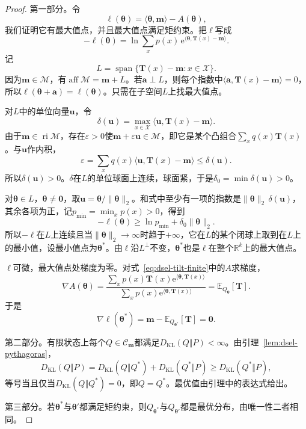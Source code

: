 \begin{proof}
第一部分。令
\[
 \ell(\bm{\theta})=\langle\bm{\theta},\bm{m}\rangle-A(\bm{\theta}) ,
\]
我们证明它有最大值点，并且最大值点满足矩约束。把$\ell$写成
\[
 -\ell(\bm{\theta})=\ln\sum_xp(x)\,\mathrm{e}^{\langle\bm{\theta},\bm{T}(x)-\bm{m}\rangle} .
\]
记
\[
 L=\operatorname{span}\{\bm{T}(x)-\bm{m}:x\in\mathcal{X}\} .
\]
因为$\bm{m}\in\mathcal{M}$，有$\operatorname{aff}\mathcal{M}=\bm{m}+L$。若$\bm{a}\perp L$，则每个指数中$\langle\bm{a},\bm{T}(x)-\bm{m}\rangle=0$，所以$\ell(\bm{\theta}+\bm{a})=\ell(\bm{\theta})$。只需在子空间$L$上找最大值点。

对$L$中的单位向量$\bm{u}$，令
\[
 \delta(\bm{u})=\max_{x\in\mathcal{X}}\langle\bm{u},\bm{T}(x)-\bm{m}\rangle .
\]
由于$\bm{m}\in\operatorname{ri}\mathcal{M}$，存在$\varepsilon>0$使$\bm{m}+\varepsilon\bm{u}\in\mathcal{M}$，即它是某个凸组合$\sum_xq(x)\bm{T}(x)$。与$\bm{u}$作内积，
\[
 \varepsilon=\sum_xq(x)\langle\bm{u},\bm{T}(x)-\bm{m}\rangle\leq\delta(\bm{u}) .
\]
所以$\delta(\bm{u})>0$。$\delta$在$L$的单位球面上连续，球面紧，于是$\delta_0=\min\delta(\bm{u})>0$。

对$\bm{\theta}\in L$，$\bm{\theta}\neq\bm{0}$，取$\bm{u}=\bm{\theta}/\lVert\bm{\theta}\rVert_2$。和式中至少有一项的指数是$\lVert\bm{\theta}\rVert_2\,\delta(\bm{u})$，其余各项为正，记$p_{\min}=\min_xp(x)>0$，得到
\[
 -\ell(\bm{\theta})\geq\ln p_{\min}+\delta_0\lVert\bm{\theta}\rVert_2 .
\]
所以$-\ell$在$L$上连续且当$\lVert\bm{\theta}\rVert_2\to\infty$时趋于$+\infty$，它在$L$的某个闭球上取到在$L$上的最小值，设最小值点为$\bm{\theta}^{*}$。由$\ell$沿$L^{\perp}$不变，$\bm{\theta}^{*}$也是$\ell$在整个$\mathbb{R}^{k}$上的最大值点。

$\ell$可微，最大值点处梯度为零。对式~\eqref{eq:dsel-tilt-finite}中的$A$求梯度，
\[
 \nabla A(\bm{\theta})=\frac{\sum_xp(x)\bm{T}(x)\mathrm{e}^{\langle\bm{\theta},\bm{T}(x)\rangle}}{\sum_xp(x)\mathrm{e}^{\langle\bm{\theta},\bm{T}(x)\rangle}}=\mathbb{E}_{Q_{\bm{\theta}}}[\bm{T}] .
\]
于是
\[
 \nabla\ell(\bm{\theta}^{*})=\bm{m}-\mathbb{E}_{Q_{\bm{\theta}^{*}}}[\bm{T}]=\bm{0} .
\]


第二部分。有限状态上每个$Q\in\mathcal{C}_{\bm{m}}$都满足$D_{\mathrm{KL}}(Q\Vert P)<\infty$。由引理~\ref{lem:dsel-pythagoras}，
\[
 D_{\mathrm{KL}}(Q\Vert P)=D_{\mathrm{KL}}(Q\Vert Q^{*})+D_{\mathrm{KL}}(Q^{*}\Vert P)\geq D_{\mathrm{KL}}(Q^{*}\Vert P),
\]
等号当且仅当$D_{\mathrm{KL}}(Q\Vert Q^{*})=0$，即$Q=Q^{*}$。最优值由引理中的表达式给出。

第三部分。若$\bm{\theta}^{*}$与$\bm{\theta}'$都满足矩约束，则$Q_{\bm{\theta}^{*}}$与$Q_{\bm{\theta}'}$都是最优分布，由唯一性二者相同。
\end{proof}


